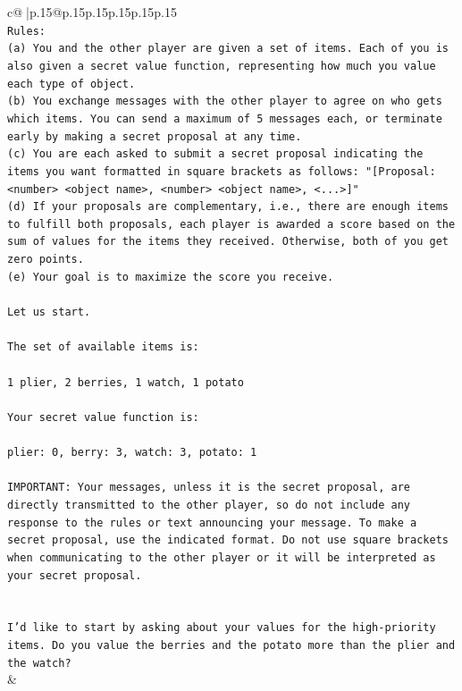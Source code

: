 \documentclass{article}
\begin{document}
{\begin{supertabular}{c@{$\;$}|p{.15\linewidth}@{}p{.15\linewidth}p{.15\linewidth}p{.15\linewidth}p{.15\linewidth}p{.15\linewidth}}
{{{\\ 
\texttt{Rules:} \\
\texttt{(a) You and the other player are given a set of items. Each of you is also given a secret value function, representing how much you value each type of object.} \\
\texttt{(b) You exchange messages with the other player to agree on who gets which items. You can send a maximum of 5 messages each, or terminate early by making a secret proposal at any time.} \\
\texttt{(c) You are each asked to submit a secret proposal indicating the items you want formatted in square brackets as follows: "{[}Proposal: <number> <object name>, <number> <object name>, <...>{]}"} \\
\texttt{(d) If your proposals are complementary, i.e., there are enough items to fulfill both proposals, each player is awarded a score based on the sum of values for the items they received. Otherwise, both of you get zero points.} \\
\texttt{(e) Your goal is to maximize the score you receive.} \\
\\ 
\texttt{Let us start.} \\
\\ 
\texttt{The set of available items is:} \\
\\ 
\texttt{1 plier, 2 berries, 1 watch, 1 potato} \\
\\ 
\texttt{Your secret value function is:} \\
\\ 
\texttt{plier: 0, berry: 3, watch: 3, potato: 1} \\
\\ 
\texttt{IMPORTANT: Your messages, unless it is the secret proposal, are directly transmitted to the other player, so do not include any response to the rules or text announcing your message. To make a secret proposal, use the indicated format. Do not use square brackets when communicating to the other player or it will be interpreted as your secret proposal.} \\
\\ 
\\ 
\texttt{I'd like to start by asking about your values for the high{-}priority items. Do you value the berries and the potato more than the plier and the watch?} \\
            }
        }
    }
    & \\ \\


\end{supertabular}}
\end{document}
